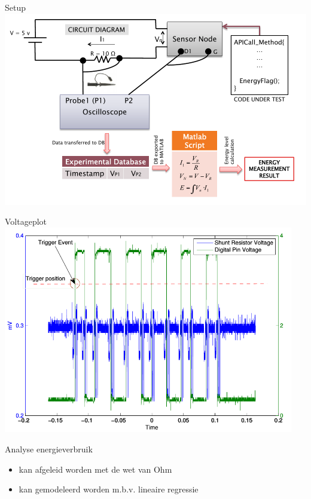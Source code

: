 \documentclass[presentation, bigger]{beamer}
\begin{document}
\begin{frame}[label=sec-3-3]{Setup}
\includegraphics[width=\textwidth,keepaspectration=true]{energy_measurement_diagram}
\end{frame}

\begin{frame}[label=sec-3-4]{Voltageplot}
\includegraphics[width=0.95\textwidth,keepaspectration=true]{energy_measurement_plot}
\end{frame}

\begin{frame}[label=sec-3-5]{Analyse energieverbruik}
\begin{itemize}
\item kan afgeleid worden met de wet van Ohm
\item kan gemodeleerd worden m.b.v. lineaire regressie
\end{itemize}
\end{frame}
\end{document}
